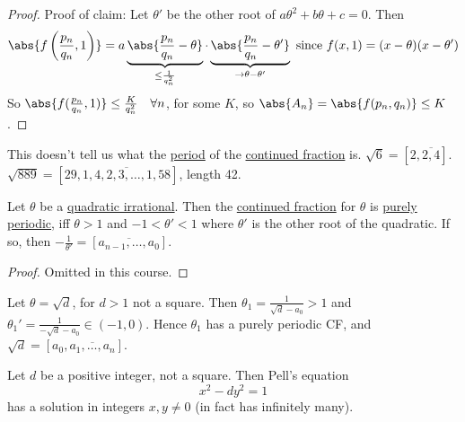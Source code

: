 \documentclass{article}
\begin{document}
\begin{proof}
    Proof of claim: Let $\theta'$ be the other root of $a \theta^2 + b \theta + c=0$. Then
    \begin{equation*}
        \abs{f\left(\frac{p_n}{q_n}, 1\right)} = a \underbrace{\abs{\frac{p_n}{q_n}-\theta}}_{\leq \frac{1}{q_n^2}} \cdot \underbrace{\abs{\frac{p_n}{q_n}-\theta'}}_{\to \theta - \theta'} \text{ since } f(x, 1) = (x - \theta)(x - \theta')
    \end{equation*}
    So $\abs{f(\frac{p_n}{q_n}, 1)} \leq \frac{K}{q_n^2} \quad \forall n$, for some $K$, so $\abs{A_n} = \abs{f(p_n, q_n)} \leq K$.
\end{proof}

\begin{remark}
    This doesn't tell us what the \hyperlink{def:period}{period} of the \hyperlink{def:cfa}{continued fraction} is. $\sqrt{6} = [2, \overline{2, 4}]$.
    $\sqrt{889} = [29, \overline{1, 4, 2, 3, \dotsc, 1, 58}]$, length 42.
\end{remark}

\begin{nthm}[Galois]\label{thm:6.8}
    Let $\theta$ be a \hyperlink{def:qi}{quadratic irrational}.
    Then the \hyperlink{def:cfa}{continued fraction} for $\theta$ is \hyperlink{def:period}{purely periodic}, iff $\theta > 1$ and $-1 < \theta' < 1$ where $\theta'$ is the other root of the quadratic.
    If so, then $-\frac{1}{\theta'} = [\overline{a_{n-1}, \dotsc, a_0}]$.
\end{nthm}
\begin{proof}
    Omitted in this course.
\end{proof}

\begin{remark}
    Let $\theta = \sqrt{d}$, for $d > 1$ not a square. Then $\theta_1 = \frac{1}{\sqrt{d} - a_0} > 1$ and $\theta_1' = \frac{1}{-\sqrt{d}-a_0} \in (-1, 0)$.
    Hence $\theta_1$ has a purely periodic CF, and $\sqrt{d} = [a_0, \overline{a_1, \dotsc, a_n}]$.
\end{remark}

\begin{nthm}\label{thm:6.9}
    Let $d$ be a positive integer, not a square. Then Pell's equation
    \begin{equation*}
        x^2 - d y^2 = 1 \tag{$*$} \label{eq:pell}
    \end{equation*}
    has a solution in integers $x, y \neq 0$ (in fact has infinitely many).
\end{nthm}
\end{document}
